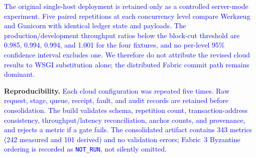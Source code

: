 \documentclass[11pt]{article}
\begin{document}
\textcolor{blue}{The original single-host deployment is retained only as a controlled server-mode experiment. Five paired repetitions at each concurrency level compare Werkzeug and Gunicorn with identical ledger state and payloads. The production/development throughput ratios below the block-cut threshold are 0.985, 0.994, 0.994, and 1.001 for the four fixtures, and no per-level 95\% confidence interval excludes one. We therefore do not attribute the revised cloud results to WSGI substitution alone; the distributed Fabric commit path remains dominant.}

\textbf{Reproducibility.} \textcolor{blue}{Each cloud configuration was repeated five times. Raw request, stage, queue, receipt, fault, and audit records are retained before consolidation. The build validates schema, repetition count, transaction-address consistency, throughput/latency reconciliation, anchor counts, and provenance, and rejects a metric if a gate fails. The consolidated artifact contains 343 metrics (242 measured and 101 derived) and no validation errors; Fabric~3 Byzantine ordering is recorded as \texttt{NOT\_RUN}, not silently omitted.}
\end{document}
